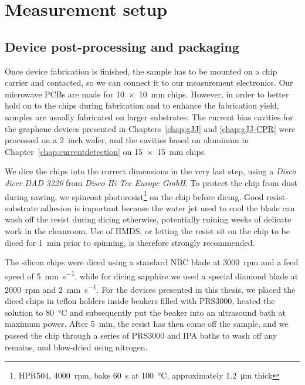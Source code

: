 \section{Measurement setup}

\subsection{Device post-processing and packaging}\label{sec:fab-packaging}

Once device fabrication is finished, the sample has to be mounted on a chip carrier and contacted, so we can connect it to our measurement electronics.
% 
Our microwave PCBs are made for \SI{10x10}{\milli\meter} chips.
%
However, in order to better hold on to the chips during fabrication and to enhance the fabrication yield, samples are usually fabricated on larger substrates:
% 
The current bias cavities for the graphene devices presented in Chapters~\ref{chap:gJJ} and \ref{chap:gJJ-CPR} were processed on a \SI{2}{inch} wafer, and the cavities based on aluminum in Chapter~\ref{chap:currentdetection} on \SI{15x15}{\milli\meter} chips.

We dice the chips into the correct dimensions in the very last step, using a \textit{Disco dicer DAD 3220} from \textit{Disco Hi-Tec Europe GmbH}.
% 
To protect the chip from dust during sawing, we spincoat photoresist\footnote{HPR504, \SI{4000}{rpm}, bake \SI{60}{\second} at \SI{100}{\celsius}, approximately \SI{1.2}{\micro\meter} thick} on the chip before dicing.
% 
Good resist-substrate adhesion is important because the water jet used to cool the blade can wash off the resist during dicing otherwise, potentially ruining weeks of delicate work in the cleanroom.
% 
Use of HMDS, or letting the resist sit on the chip to be diced for \SI{1}{\minute} prior to spinning, is therefore strongly recommended.

The silicon chips were diced using a standard NBC blade at \SI{3000}{rpm} and a feed speed of \SI{5}{\milli\meter\per\second}, while for dicing sapphire we used a special diamond blade at \SI{2000}{rpm} and \SI{2}{\milli\meter\per\second}.
% 
For the devices presented in this thesis, we placed the diced chips in teflon holders inside beakers filled with PRS3000, heated the solution to \SI{80}{\celsius} and subsequently put the beaker into an ultrasound bath at maximum power.
% 
After \SI{5}{\minute}, the resist has then come off the sample, and we passed the chip through a series of PRS3000 and IPA baths to wash off any remains, and blow-dried using nitrogen.

